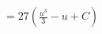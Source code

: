 \documentclass[preview]{standalone}
\begin{document}
\begin{align*}
&=27(\frac{u^3}{3}-u+C)
\end{align*}
\end{document}
